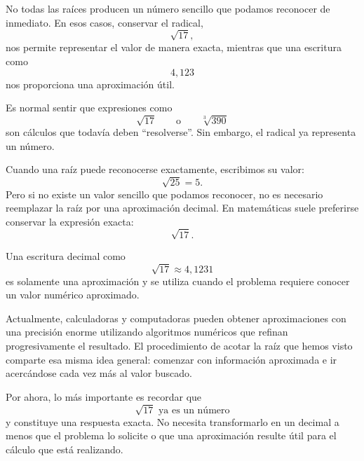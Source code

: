 No todas las raíces producen un número sencillo que podamos reconocer de inmediato. En esos casos, conservar el radical,
\[
\sqrt{17},
\]
nos permite representar el valor de manera exacta, mientras que una escritura como
\[
4{,}123
\]
nos proporciona una aproximación útil.

\begin{note}
Es normal sentir que expresiones como
\[
\sqrt{17}
\qquad\text{o}\qquad
\sqrt[3]{390}
\]
son cálculos que todavía deben ``resolverse''. Sin embargo, el radical ya representa un número.

Cuando una raíz puede reconocerse exactamente, escribimos su valor:
\[
\sqrt{25}=5.
\]
Pero si no existe un valor sencillo que podamos reconocer, no es necesario reemplazar la raíz por una aproximación decimal. En matemáticas suele preferirse conservar la expresión exacta:
\[
\sqrt{17}.
\]

Una escritura decimal como
\[
\sqrt{17}\approx4{,}1231
\]
es solamente una aproximación y se utiliza cuando el problema requiere conocer un valor numérico aproximado.

Actualmente, calculadoras y computadoras pueden obtener aproximaciones con una precisión enorme utilizando algoritmos numéricos que refinan progresivamente el resultado. El procedimiento de acotar la raíz que hemos visto comparte esa misma idea general: comenzar con información aproximada e ir acercándose cada vez más al valor buscado.

Por ahora, lo más importante es recordar que
\[
\boxed{\sqrt{17}\text{ ya es un número}}
\]
y constituye una respuesta exacta. No necesita transformarlo en un decimal a menos que el problema lo solicite o que una aproximación resulte útil para el cálculo que está realizando.
\end{note}
